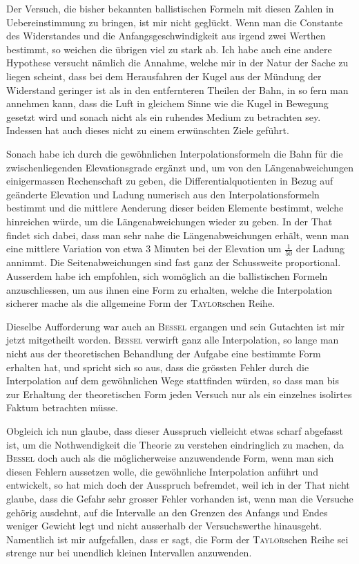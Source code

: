 \documentclass[12pt,a4paper]{article}
\begin{document}
Der Versuch, die bisher bekannten ballistischen Formeln mit diesen Zahlen in Uebereinstimmung zu bringen, ist mir nicht gegl\"uckt. Wenn man die Constante des Widerstandes und die Anfangsgeschwindigkeit aus irgend zwei Werthen bestimmt, so weichen die \"ubrigen viel zu stark ab. Ich habe auch eine andere Hypothese versucht n\"amlich die Annahme, welche mir in der Natur der Sache zu liegen scheint, dass bei dem Herausfahren der Kugel aus der M\"undung der Widerstand geringer ist als in den entfernteren Theilen der Bahn, in so fern man annehmen kann, dass die Luft in gleichem Sinne wie die Kugel in Bewegung gesetzt wird und sonach nicht als ein ruhendes Medium zu betrachten sey. Indessen hat auch dieses nicht zu einem erw\"unschten Ziele gef\"uhrt.

Sonach habe ich durch die gew\"ohnlichen Interpolationsformeln die Bahn f\"ur die zwischenliegenden Elevationsgrade erg\"anzt und, um von den L\"angenabweichungen einigermassen Rechenschaft zu geben, die Differentialquotienten in Bezug auf ge\"anderte Elevation und Ladung numerisch aus den Interpolationsformeln bestimmt und die mittlere Aenderung dieser beiden Elemente bestimmt, welche hinreichen w\"urde, um die L\"angenabweichungen wieder zu geben. In der That findet sich dabei, dass man sehr nahe die L\"angenabweichungen erh\"alt, wenn man eine mittlere Variation von etwa 3 Minuten bei der Elevation um $\frac{1}{50}$ der Ladung annimmt. Die Seitenabweichungen sind fast ganz der Schussweite proportional. Ausserdem habe ich empfohlen, sich wom\"oglich an die ballistischen Formeln anzuschliessen, um aus ihnen eine Form zu erhalten, welche die Interpolation sicherer mache als die allgemeine Form der \textsc{Taylor}schen Reihe.

Dieselbe Aufforderung war auch an \textsc{Bessel} ergangen und sein Gutachten ist mir jetzt mitgetheilt worden. \textsc{Bessel} verwirft ganz alle Interpolation, so lange man nicht aus der theoretischen Behandlung der Aufgabe eine bestimmte Form erhalten hat, und spricht sich so aus, dass die gr\"ossten Fehler durch die Interpolation auf dem gew\"ohnlichen Wege stattfinden w\"urden, so dass man bis zur Erhaltung der theoretischen Form jeden Versuch nur als ein einzelnes isolirtes Faktum betrachten m\"usse.

Obgleich ich nun glaube, dass dieser Ausspruch vielleicht etwas scharf abgefasst ist, um die Nothwendigkeit die Theorie zu verstehen eindringlich zu machen, da \textsc{Bessel} doch auch als die m\"oglicherweise anzuwendende Form, wenn man sich diesen Fehlern aussetzen wolle, die gew\"ohnliche Interpolation anf\"uhrt und entwickelt, so hat mich doch der Ausspruch befremdet, weil ich in der That nicht glaube, dass die Gefahr sehr grosser Fehler vorhanden ist, wenn man die Versuche geh\"orig ausdehnt, auf die Intervalle an den Grenzen des Anfangs und Endes weniger Gewicht legt und nicht ausserhalb der Versuchswerthe hinausgeht. Namentlich ist mir aufgefallen, dass er sagt, die Form der \textsc{Taylor}schen Reihe sei strenge nur bei unendlich kleinen Intervallen anzuwenden.
\end{document}

